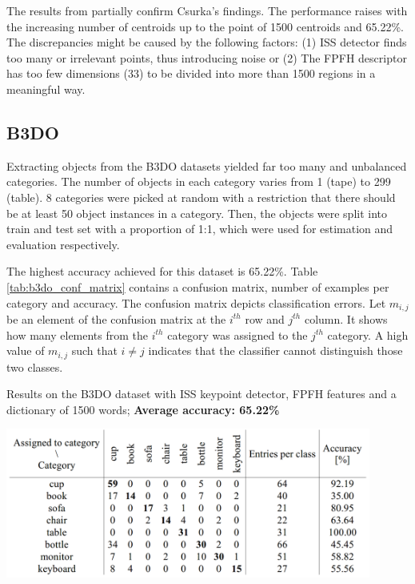 \documentclass[11pt,twoside]{article}
\begin{document}
    The results from  partially confirm Csurka's findings. The performance raises with the increasing number of centroids up to the point of 1500 centroids and 65.22\%. The discrepancies might be caused by the following factors: (1) ISS detector finds too many or irrelevant points, thus introducing noise or (2) The FPFH descriptor has too few dimensions (33) to be divided into more than 1500 regions in a meaningful way. 


  \subsection{B3DO}
    Extracting objects from the B3DO datasets yielded far too many and unbalanced categories. The number of objects in each category varies from 1 (tape) to 299 (table). 8 categories were picked at random with a restriction that there should be at least 50 object instances in a category. Then, the objects were split into train and test set with a proportion of 1:1, which were used for estimation and evaluation respectively.

    The highest accuracy achieved for this dataset is 65.22\%. Table \ref{tab:b3do_conf_matrix} contains a confusion matrix, number of examples per category and accuracy. The confusion matrix depicts classification errors. Let $m_{i, j}$ be an element of the confusion matrix at the $i^{th}$ row and $j^{th}$ column. It shows how many elements from the $i^{th}$ category was assigned to the $j^{th}$ category. A high value of $m_{i, j}$ such that $i \neq j$ indicates that the classifier cannot distinguish those two classes.

    \begin{table}[!ht]
    \centering
    \caption{Results on the B3DO dataset with ISS keypoint detector, FPFH features and a dictionary of 1500 words; \textbf{Average accuracy: 65.22\%}}
    \includegraphics[width=0.9\textwidth]{../figs/b3do_conf_matrix}	
    \label{tab:b3do_conf_matrix}
    \end{table}   
\end{document}
